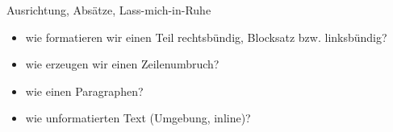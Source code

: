 \begin{frame}{Ausrichtung, Absätze, Lass-mich-in-Ruhe}
    \begin{itemize}
        \item wie formatieren wir einen Teil rechtsbündig, Blocksatz bzw. linksbündig?
        \item wie erzeugen wir einen Zeilenumbruch?
        \item wie einen Paragraphen?
        \item wie unformatierten Text (Umgebung, inline)?
    \end{itemize}
\end{frame}



